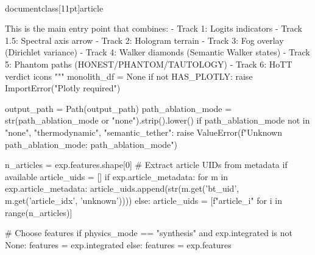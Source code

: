 \\documentclass[11pt]{article}
\begin{document}
\begin{CodeBlock}
{{{{{    This is the main entry point that combines:
    - Track 1: Logits indicators
    - Track 1.5: Spectral axis arrow
    - Track 2: Hologram terrain
    - Track 3: Fog overlay (Dirichlet variance)
    - Track 4: Walker diamonds (Semantic Walker states)
    - Track 5: Phantom paths (HONEST/PHANTOM/TAUTOLOGY)
    - Track 6: HoTT verdict icons
    """
    monolith_df = None
    if not HAS_PLOTLY:
        raise ImportError("Plotly required")

    output_path = Path(output_path)
    path_ablation_mode = str(path_ablation_mode or "none").strip().lower()
    if path_ablation_mode not in {"none", "thermodynamic", "semantic_tether"}:
        raise ValueError(f"Unknown path_ablation_mode: {path_ablation_mode}")

    n_articles = exp.features.shape[0]
    # Extract article UIDs from metadata if available
    article_uids = []
    if exp.article_metadata:
        for m in exp.article_metadata:
            article_uids.append(str(m.get('bt_uid', m.get('article_idx', 'unknown'))))
    else:
        article_uids = [f"article_{i}" for i in range(n_articles)]

    # Choose features
    if physics_mode == "synthesis" and exp.integrated is not None:
        features = exp.integrated
    else:
        features = exp.features

}}}}}
\end{CodeBlock}
\end{document}
